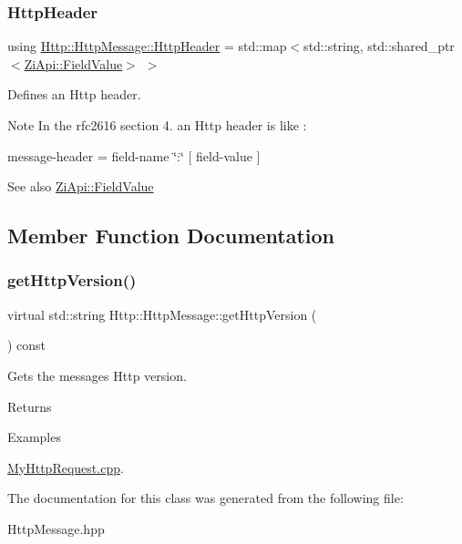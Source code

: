 \subsubsection{\texorpdfstring{HttpHeader}{HttpHeader}}
{\footnotesize\ttfamily using \mbox{\hyperlink{classHttp_1_1HttpMessage_a48fdadff82b4d5d227480a43166d008f}{Http\+::\+Http\+Message\+::\+Http\+Header}} =  std\+::map$<$std\+::string, std\+::shared\+\_\+ptr$<$\mbox{\hyperlink{classZiApi_1_1FieldValue}{Zi\+Api\+::\+Field\+Value}}$>$ $>$}



Defines an Http header. 

\begin{DoxyNote}{Note}
In the rfc2616 section 4. an Http header is like \+: 

message-\/header = field-\/name \char`\"{}\+:\char`\"{} \mbox{[} field-\/value \mbox{]} 
\end{DoxyNote}
\begin{DoxySeeAlso}{See also}
\mbox{\hyperlink{classZiApi_1_1FieldValue}{Zi\+Api\+::\+Field\+Value}} 
\end{DoxySeeAlso}


\subsection{Member Function Documentation}
\mbox{\label{classHttp_1_1HttpMessage_a7588c7947b5eafbbe4c84b074cf2e194}} 
\subsubsection{\texorpdfstring{getHttpVersion()}{getHttpVersion()}}
{\footnotesize\ttfamily virtual std\+::string Http\+::\+Http\+Message\+::get\+Http\+Version (\begin{DoxyParamCaption}{ }\end{DoxyParamCaption}) const\hspace{0.3cm}{\ttfamily [pure virtual]}}



Gets the message\textquotesingle{}s Http version. 

\begin{DoxyReturn}{Returns}

\begin{DoxyCode}{0}
\DoxyCodeLine{\textcolor{stringliteral}{"HTTP/major.minor"} }
\end{DoxyCode}
 
\end{DoxyReturn}
\begin{Desc}
\item[Examples]\par
\mbox{\hyperlink{MyHttpRequest_8cpp-example}{My\+Http\+Request.\+cpp}}.\end{Desc}


The documentation for this class was generated from the following file\+:\begin{DoxyCompactItemize}
\item 
Http\+Message.\+hpp\end{DoxyCompactItemize}
